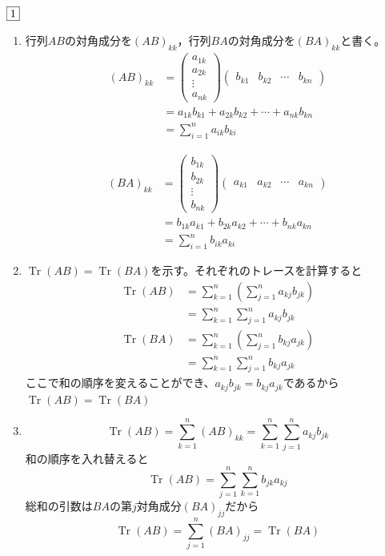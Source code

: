 \documentclass[dvipdfmx]{jsreport}
\DeclareMathOperator{\Tr}{Tr}
\newcounter{num}[section]
\begin{document}
\begin{answer} %
	$\fbox{1}$ 
\begin{enumerate}
	\item 行列$AB$の対角成分を$(AB)_{kk}$，行列$BA$の対角成分を$(BA)_{kk}$と書く。
\begin{align*}
	(AB)_{kk}
&= \begin{pmatrix}a_{1k}\\ a_{2k}\\ \vdots\\ a_{nk}\end{pmatrix}\begin{pmatrix}b_{k1}& b_{k2}& \cdots& b_{kn}\end{pmatrix}\\
&= a_{1k}b_{k1}+ a_{2k}b_{k2}+ \cdots+ a_{nk}b_{kn}\\
&= \sum_{i= 1}^n a_{ik}b_{ki}
\end{align*}

\begin{align*}
	(BA)_{kk}
&= \begin{pmatrix}b_{1k}\\ b_{2k}\\ \vdots\\ b_{nk}\end{pmatrix}\begin{pmatrix}a_{k1}& a_{k2}& \cdots& a_{kn}\end{pmatrix}\\
&= b_{1k}a_{k1}+ b_{2k}a_{k2}+ \cdots+ b_{nk}a_{kn}\\
&= \sum_{i= 1}^n b_{ik}a_{ki}
\end{align*}

	\item $\Tr{(AB)}= \Tr{(BA)}$を示す。それぞれのトレースを計算すると
\begin{align*}
	\Tr{(AB)}
&= \sum_{k= 1}^n \left(\sum_{j= 1}^ n a_{kj}b_{jk}\right)\\
&= \sum_{k= 1}^n \sum_{j= 1}^ n a_{kj}b_{jk}\\
	\Tr{(BA)}
&= \sum_{k= 1}^n \left(\sum_{j= 1}^ n b_{kj}a_{jk}\right)\\
&= \sum_{k= 1}^n \sum_{j= 1}^n b_{kj}a_{jk}
\end{align*}
	ここで和の順序を変えることができ、$a_{kj}b_{jk}= b_{kj}a_{jk}$であるから$\Tr{(AB)}= \Tr{(BA)}$

	\item 
\begin{equation*}
	\Tr{(AB)}= \sum_{k= 1}^n(AB)_{kk}= \sum_{k= 1}^n \sum_{j= 1}^n a_{kj}b_{jk}
\end{equation*}
	和の順序を入れ替えると
\begin{equation*}
	\Tr{(AB)}= \sum_{j= 1}^n\sum_{k= 1}^n b_{jk}a_{kj}
\end{equation*}
	総和の引数は$BA$の第$j$対角成分$(BA)_{jj}$だから
\begin{equation*}
	\Tr{(AB)}= \sum_{j= 1}^n(BA)_{jj}= \Tr{(BA)}
\end{equation*}


\end{enumerate}
\end{answer}
\end{document}
